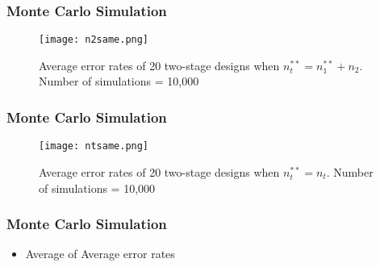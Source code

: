 \documentclass{beamer}\usepackage[]{graphicx}\usepackage[]{color}
\begin{document}
\begin{frame}
\frametitle{Monte Carlo Simulation}
\tiny
\begin{figure}
\caption{Average error rates of 20 two-stage designs when $n_t^{\ast\ast} = n_1^{\ast\ast} + n_2$. Number of simulations = 10,000}
\texttt{[image: n2same.png]}
\end{figure}
\end{frame}

\begin{frame}
\frametitle{Monte Carlo Simulation}
\tiny
\begin{figure}
\caption{Average error rates of 20 two-stage designs when $n_t^{\ast\ast} = n_t$. Number of simulations = 10,000}
\texttt{[image: ntsame.png]}
\end{figure}
\end{frame}

\begin{frame}
\frametitle{Monte Carlo Simulation}
    \begin{itemize}
        \item Average of Average error rates
    \end{itemize}
\end{frame}

\end{document}
